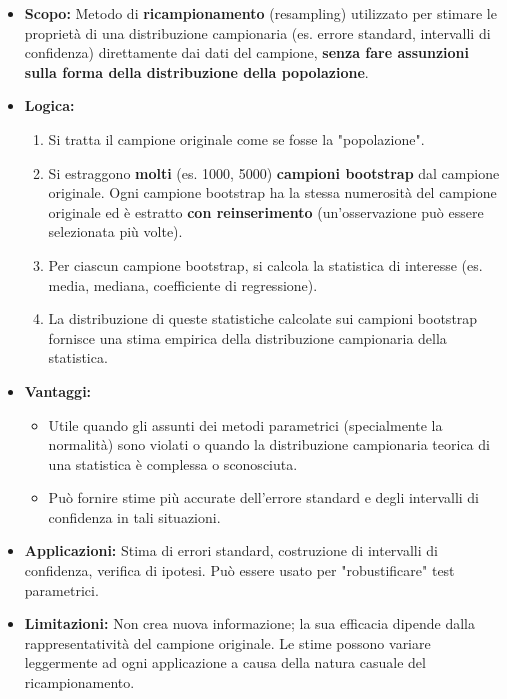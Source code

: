 \documentclass[12pt, a4paper]{article}
\begin{document}
\begin{itemize}
    \item \textbf{Scopo:} Metodo di \textbf{ricampionamento} (resampling) utilizzato per stimare le proprietà di una distribuzione campionaria (es. errore standard, intervalli di confidenza) direttamente dai dati del campione, \textbf{senza fare assunzioni sulla forma della distribuzione della popolazione}.
    \item \textbf{Logica:}
        \begin{enumerate}
            \item Si tratta il campione originale come se fosse la "popolazione".
            \item Si estraggono \textbf{molti} (es. 1000, 5000) \textbf{campioni bootstrap} dal campione originale. Ogni campione bootstrap ha la stessa numerosità del campione originale ed è estratto \textbf{con reinserimento} (un'osservazione può essere selezionata più volte).
            \item Per ciascun campione bootstrap, si calcola la statistica di interesse (es. media, mediana, coefficiente di regressione).
            \item La distribuzione di queste statistiche calcolate sui campioni bootstrap fornisce una stima empirica della distribuzione campionaria della statistica.
        \end{enumerate}
    \item \textbf{Vantaggi:}
        \begin{itemize}
            \item Utile quando gli assunti dei metodi parametrici (specialmente la normalità) sono violati o quando la distribuzione campionaria teorica di una statistica è complessa o sconosciuta.
            \item Può fornire stime più accurate dell'errore standard e degli intervalli di confidenza in tali situazioni.
        \end{itemize}
    \item \textbf{Applicazioni:} Stima di errori standard, costruzione di intervalli di confidenza, verifica di ipotesi. Può essere usato per "robustificare" test parametrici.
    \item \textbf{Limitazioni:} Non crea nuova informazione; la sua efficacia dipende dalla rappresentatività del campione originale. Le stime possono variare leggermente ad ogni applicazione a causa della natura casuale del ricampionamento.
\end{itemize}
\end{document}
